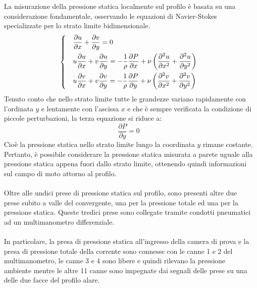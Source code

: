 \noindent La misurazione della pressione statica localmente sul profilo è basata su una considerazione fondamentale, osservando le equazioni di Navier-Stokes specializzate per lo strato limite bidimensionale.
\begin{equation*}
    \begin{dcases}
        &\frac{\partial u}{\partial x} + \frac{\partial v}{\partial y} = 0\\
        & u\frac{\partial u}{\partial x} + v\frac{\partial u}{\partial y} = -\frac1\rho \frac{\partial P}{\partial x} + \nu\left( \frac{\partial^2 u}{\partial x^2} + \frac{\partial^2 u}{\partial y^2} \right)\\
        & u\frac{\partial v}{\partial x} + v\frac{\partial v}{\partial y} = -\frac1\rho \frac{\partial P}{\partial y} + \nu\left( \frac{\partial^2 v}{\partial x^2} + \frac{\partial^2 v}{\partial y^2} \right)
    \end{dcases}
\end{equation*}
Tenuto conto che nello strato limite tutte le grandezze variano rapidamente con l'ordinata $y$ e lentamente con l'ascissa $x$ e che è sempre verificata la condizione di piccole perturbazioni, la terza equazione si riduce a:
\begin{equation*}
    \frac{\partial P}{\partial y} = 0
\end{equation*}
Cioè la pressione statica nello strato limite lungo la coordinata $y$ rimane costante. Pertanto, è possibile considerare la pressione statica misurata a parete uguale alla pressione statica appena fuori dallo strato limite, ottenendo quindi informazioni sul campo di moto attorno al profilo.\\\\
Oltre alle undici prese di pressione statica sul profilo, sono presenti altre due prese subito a valle del convergente, una per la pressione totale ed una per la pressione statica. Queste tredici prese sono collegate tramite condotti pneumatici ad un multimanometro differenziale.\\\\
In particolare, la presa di pressione statica all'ingresso della camera di prova e la presa di pressione totale della corrente sono connesse con le canne 1 e 2 del multimanometro, le canne 3 e 4 sono libere e quindi rilevano la pressione ambiente mentre le altre 11 canne sono impegnate dai segnali delle prese su una delle due facce del profilo alare.

